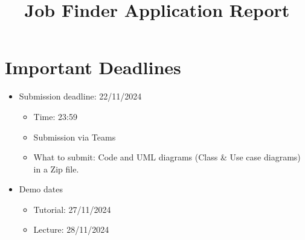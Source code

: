 \documentclass{article}
\title{Job Finder Application Report}
\date{}
\begin{document}
\maketitle

\section*{Important Deadlines}
\begin{itemize}
    \item Submission deadline: 22/11/2024 
    \begin{itemize}
        \item Time: 23:59
        \item Submission via Teams
        \item What to submit: Code and UML diagrams (Class \& Use case diagrams) in a Zip file.
    \end{itemize}
    \item Demo dates
    \begin{itemize}
        \item Tutorial: 27/11/2024
        \item Lecture: 28/11/2024
    \end{itemize}
\end{itemize}
\end{document}

